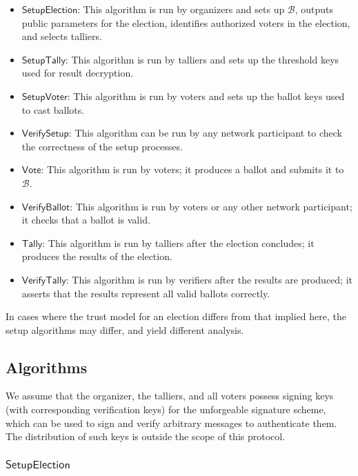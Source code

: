 \documentclass{article}
\newcommand{\func}[1]{\mathsf{#1}}
\begin{document}
\begin{itemize}
	\item $\func{SetupElection}$: This algorithm is run by organizers and sets up $\mathcal{B}$, outputs public parameters for the election, identifies authorized voters in the election, and selects talliers.
	\item $\func{SetupTally}$: This algorithm is run by talliers and sets up the threshold keys used for result decryption.
	\item $\func{SetupVoter}$: This algorithm is run by voters and sets up the ballot keys used to cast ballots.
	\item $\func{VerifySetup}$: This algorithm can be run by any network participant to check the correctness of the setup processes.
	\item $\func{Vote}$: This algorithm is run by voters; it produces a ballot and submits it to $\mathcal{B}$.
	\item $\func{VerifyBallot}$: This algorithm is run by voters or any other network participant; it checks that a ballot is valid.
	\item $\func{Tally}$: This algorithm is run by talliers after the election concludes; it produces the results of the election.
	\item $\func{VerifyTally}$: This algorithm is run by verifiers after the results are produced; it asserts that the results represent all valid ballots correctly.
\end{itemize}

In cases where the trust model for an election differs from that implied here, the setup algorithms may differ, and yield different analysis.


\subsection{Algorithms}

We assume that the organizer, the talliers, and all voters possess signing keys (with corresponding verification keys) for the unforgeable signature scheme, which can be used to sign and verify arbitrary messages to authenticate them.
The distribution of such keys is outside the scope of this protocol.


\subsubsection{\texorpdfstring{$\func{SetupElection}$}{SetupElection}}
\end{document}
